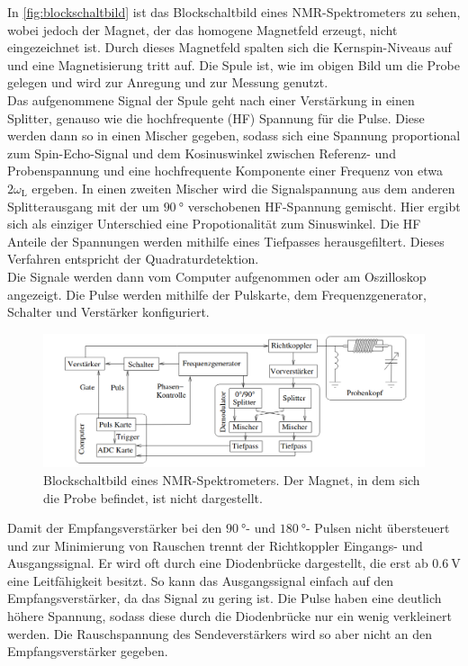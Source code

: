         \noindent In \autoref{fig:blockschaltbild} ist das Blockschaltbild eines NMR-Spektrometers zu sehen, wobei jedoch der Magnet, der das homogene Magnetfeld erzeugt, nicht eingezeichnet ist. Durch dieses Magnetfeld 
        spalten sich die Kernspin-Niveaus auf und eine Magnetisierung tritt auf. Die Spule ist, wie im obigen Bild um die Probe gelegen und wird zur Anregung und zur Messung genutzt. \\
        Das aufgenommene Signal der Spule geht nach einer Verstärkung in einen Splitter, genauso wie die hochfrequente (HF) Spannung für die Pulse. Diese werden dann so in einen Mischer gegeben, sodass sich 
        eine Spannung proportional zum Spin-Echo-Signal und dem Kosinuswinkel zwischen Referenz- und Probenspannung und eine hochfrequente Komponente einer Frequenz von etwa $2\omega_\text{L}$ ergeben. 
        In einen zweiten Mischer wird die Signalspannung aus dem anderen Splitterausgang mit der um $\SI{90}{\degree}$ verschobenen HF-Spannung gemischt. Hier ergibt sich als einziger Unterschied eine 
        Propotionalität zum Sinuswinkel. Die HF Anteile der Spannungen werden mithilfe eines Tiefpasses herausgefiltert. Dieses Verfahren entspricht der Quadraturdetektion. \\ 
        Die Signale werden dann vom Computer aufgenommen oder am Oszilloskop angezeigt. 
        Die Pulse werden mithilfe der Pulskarte, dem Frequenzgenerator, Schalter und Verstärker konfiguriert.

        \begin{figure}[H]
            \centering
            \includegraphics[width=\textwidth]{latex/images/blockschaltbild_nmr.png}
            \caption{Blockschaltbild eines NMR-Spektrometers. Der Magnet, in dem sich die Probe befindet, ist nicht dargestellt. \cite{grundlagen}}
            \label{fig:blockschaltbild}
        \end{figure}

        \noindent Damit der Empfangsverstärker bei den $\SI{90}{\degree}$- und $\SI{180}{\degree}$- Pulsen nicht übersteuert und zur Minimierung von Rauschen trennt der Richtkoppler Eingangs- und Ausgangssignal. 
        Er wird oft durch eine Diodenbrücke dargestellt, die erst ab $\SI{0.6}{\volt}$ eine Leitfähigkeit besitzt. So kann das Ausgangssignal einfach auf den Empfangsverstärker, da das Signal zu gering ist. 
        Die Pulse haben eine deutlich höhere Spannung, sodass diese durch die Diodenbrücke nur ein wenig verkleinert werden. Die Rauschspannung des Sendeverstärkers wird so aber nicht an den Empfangsverstärker 
        gegeben. 

